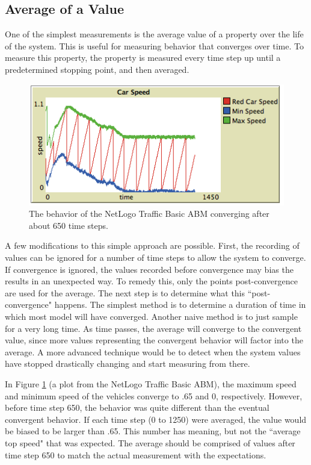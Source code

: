 \subsection{Average of a Value}
One of the simplest measurements is the average value of a property over the life of the system.
This is useful for measuring behavior that converges over time.
To measure this property, the property is measured every time step up until a predetermined stopping point, and then averaged.

\begin{figure}[ht]
\centering
\includegraphics[scale=.75]{images/traffic_converge.png}
\caption{The behavior of the NetLogo Traffic Basic ABM converging after about 650 time steps.}
\label{fig:traffic_converge}
\end{figure}


A few modifications to this simple approach are possible.
First, the recording of values can be ignored for a number of time steps to allow the system to converge.
If convergence is ignored, the values recorded before convergence may bias the results in an unexpected way.
To remedy this, only the points post-convergence are used for the average.
The next step is to determine what this ``post-convergence" happens.
The simplest method is to determine a duration of time in which most model will have converged.
Another naive method is to just sample for a very long time.
As time passes, the average will converge to the convergent value, since more values representing the convergent behavior will factor into the average.
A more advanced technique would be to detect when the system values have stopped drastically changing and start measuring from there.

In Figure \ref{fig:traffic_converge} (a plot from the NetLogo Traffic Basic ABM), the maximum speed and minimum speed of the vehicles converge to .65 and 0, respectively.
However, before time step 650, the behavior was quite different than the eventual convergent behavior.
If each time step (0 to 1250) were averaged, the value would be biased to be larger than .65.
This number has meaning, but not the ``average top speed" that was expected.
The average should be comprised of values after time step 650 to match the actual measurement with the expectations.

